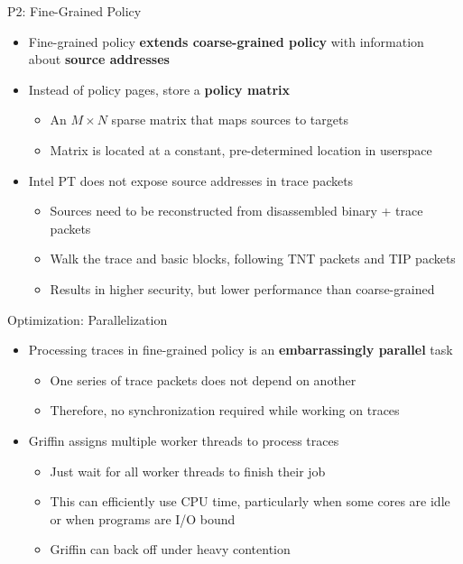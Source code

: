 \documentclass[12pt, dvipsnames, aspectratio=169]{beamer}
\begin{document}
\begin{frame}[c]{P2: Fine-Grained Policy}{}
  \begin{itemize}
    \item Fine-grained policy {\bf extends coarse-grained policy} with information\\about {\bf source addresses}

    \vfill
    \item Instead of policy pages, store a {\bf policy matrix}
    \begin{itemize}
      \item An $M \times N$ sparse matrix that maps sources to targets
      \item Matrix is located at a constant, pre-determined location in userspace
    \end{itemize}

    \vfill
    \item Intel PT does not expose source addresses in trace packets
    \begin{itemize}
      \item Sources need to be reconstructed from disassembled binary + trace packets
      \item Walk the trace and basic blocks, following TNT packets and TIP packets
      \item Results in higher security, but lower performance than coarse-grained
    \end{itemize}
  \end{itemize}
\end{frame}

\begin{frame}[c]{Optimization: Parallelization}{}
  \begin{itemize}
    \item Processing traces in fine-grained policy is an {\bf embarrassingly parallel} task
    \begin{itemize}
      \item One series of trace packets does not depend on another
      \item Therefore, no synchronization required while working on traces
    \end{itemize}

    \vfill
    \item Griffin assigns multiple worker threads to process traces
    \begin{itemize}
      \item Just wait for all worker threads to finish their job
      \item This can efficiently use CPU time, particularly when some cores are idle\\or when programs are I/O bound
      \item Griffin can back off under heavy contention
    \end{itemize}
  \end{itemize}
\end{frame}
\end{document}
